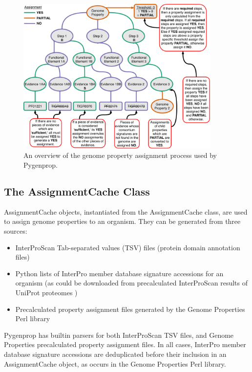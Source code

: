 \begin{figure}[!ht]
  \centering
	\includegraphics[width=0.90\textwidth]{media/Pygenprop_Assignment.pdf}
	 \caption{An overview of the genome property assignment process used by Pygenprop.}
	 \label{fig:propertyassignment}
\end{figure}

\subsection{The AssignmentCache Class}

AssignmentCache objects, instantiated from the AssignmentCache class, are used to assign genome properties to an organism. They can be generated from three sources: 
\begin{itemize}
\item InterProScan Tab-separated values (TSV) files (protein domain annotation files) 
\item Python lists of InterPro member database signature accessions for an organism (as could be downloaded from precalculated InterProScan results of UniProt proteomes \cite{uniprot2014uniprot})
\item Precalculated property assignment files generated by the Genome Properties Perl library
\end{itemize}
Pygenprop has builtin parsers for both InterProScan TSV files, and Genome Properties precalculated property assignment files. In all cases, InterPro member database signature accessions are deduplicated before their inclusion in an AssignmentCache object, as occurs in the Genome Properties Perl library.

